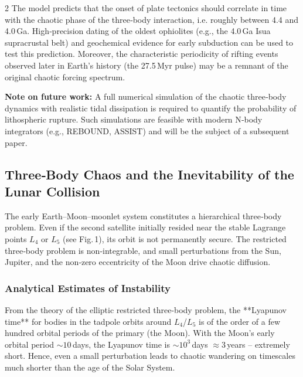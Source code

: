 \documentclass[11pt,a4paper]{article}
\begin{document}
\begin{multicols}{2}
		The model predicts that the onset of plate tectonics should correlate in time with the chaotic phase of the three‑body interaction, i.e. roughly between 4.4 and 4.0 Ga.  High‑precision dating of the oldest ophiolites (e.g., the 4.0 Ga Isua supracrustal belt) and geochemical evidence for early subduction can be used to test this prediction.  Moreover, the characteristic periodicity of rifting events observed later in Earth’s history (the 27.5 Myr pulse) may be a remnant of the original chaotic forcing spectrum.
		
		\vspace{0.2cm}
		\noindent
		\textbf{Note on future work:} A full numerical simulation of the chaotic three‑body dynamics with realistic tidal dissipation is required to quantify the probability of lithospheric rupture.  Such simulations are feasible with modern N‑body integrators (e.g., REBOUND, ASSIST) and will be the subject of a subsequent paper.
		
		
		\subsection{Three‑Body Chaos and the Inevitability of the Lunar Collision}
		
		The early Earth–Moon–moonlet system constitutes a hierarchical three‑body problem.  
		Even if the second satellite initially resided near the stable Lagrange points 
		\(L_4\) or \(L_5\) (see Fig. 1), its orbit is not permanently secure.  
		The restricted three‑body problem is non‑integrable, and small perturbations 
		from the Sun, Jupiter, and the non‑zero eccentricity of the Moon drive 
		chaotic diffusion.
		
		\subsubsection{Analytical Estimates of Instability}
		
		From the theory of the elliptic restricted three‑body problem, the 
		**Lyapunov time** for bodies in the tadpole orbits around \(L_4\)/\(L_5\) 
		is of the order of a few hundred orbital periods of the primary (the Moon).  
		With the Moon’s early orbital period \(\sim 10\) days, the Lyapunov time is 
		\(\sim 10^{3}\) days \(\approx 3\) years – extremely short.  Hence, even a 
		small perturbation leads to chaotic wandering on timescales much shorter 
		than the age of the Solar System.
		

\end{multicols}
\end{document}
